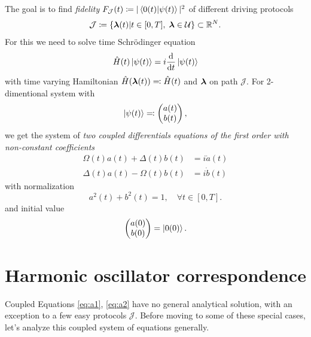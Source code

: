 The goal is to find \emph{fidelity} $F_{\mathcal J}(t)\coloneqq |\braket{0(t)|\psi(t)}|^2$ of different driving protocols \begin{equation}
    \mathcal J\coloneqq\{{\bm\lambda}(t)|t\in[0,T],\; {\bm\lambda}\in \mathcal U\} \subset \mathbb{R}^N.
\end{equation}
For this we need to solve time Schr\"odinger equation
\begin{equation}
    \hat{H}(t)\ket{\psi(t)}=i\frac{\mathrm{d}}{\mathrm{d} t}\ket{\psi(t)}
\end{equation}
with time varying Hamiltonian $\hat{H}({\bm\lambda}(t))\eqqcolon \hat{H}(t)$ and ${\bm\lambda}$ on path $\mathcal J$. For 2-dimentional system with 
\begin{equation}
    \ket{\psi(t)}\eqqcolon \begin{pmatrix}
         a(t) \\
         b(t)    
    \end{pmatrix},
\end{equation}
we get the system of \emph{two coupled differentials equations of the first order with non-constant coefficients}
\begin{align}
    \Omega(t)a(t)+\Delta(t)b(t)&=i\dot a(t)\label{eq:a1}\\
    \Delta(t)a(t)-\Omega(t)b(t)&=i\dot b(t)
    \label{eq:a2}
\end{align}
with normalization
\begin{equation}
    a^2(t)+b^2(t)=1, \quad \forall t\in [0,T].
    \label{eq:normalizationCondition}
\end{equation}
and initial value 
\begin{equation}
    \begin{pmatrix}
        a(0)\\b(0)
    \end{pmatrix} = \ket{0(0)}.
\end{equation}















\section{Harmonic oscillator correspondence}
Coupled Equations \ref{eq:a1}, \ref{eq:a2} have no general analytical solution, with an exception to a few easy protocols $\mathcal J$. Before moving to some of these special cases, let's analyze this coupled system of equations generally.

